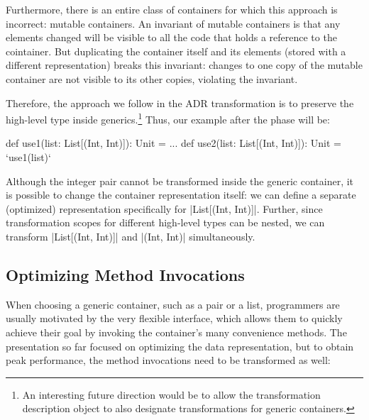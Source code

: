 Furthermore, there is an entire class of containers for which this approach is incorrect: mutable containers. An invariant of mutable containers is that any elements changed will be visible to all the code that holds a reference to the cointainer. But duplicating the container itself and its elements (stored with a different representation) breaks this invariant: changes to one copy of the mutable container are not visible to its other copies, violating the invariant.

Therefore, the approach we follow in the ADR transformation is to
preserve the high-level type inside generics.\footnote{An interesting
  future direction would be to allow the transformation description
  object to also designate transformations for generic containers.}
Thus, our example after the \commit{} phase will be:

\begin{lstlisting-nobreak}
def use1(list: List[(Int, Int)]): Unit = ...
def use2(list: List[(Int, Int)]): Unit = `use1(list)`
\end{lstlisting-nobreak}

Although the integer pair cannot be transformed inside the generic
container, it is possible to change the container representation
itself: we can define a separate (optimized) representation
specifically for |List[(Int, Int)]|. Further, since transformation
scopes for different high-level types can be nested, we can transform
|List[(Int, Int)]| and |(Int, Int)| simultaneously.



\subsection{Optimizing Method Invocations}
\label{sec:ildl:semantics}

When choosing a generic container, such as a pair or a list, programmers are usually motivated by the very flexible interface, which allows them to quickly achieve their goal by invoking the container's many convenience methods. The presentation so far focused on optimizing the data representation, but to obtain peak performance, the method invocations need to be transformed as well:

